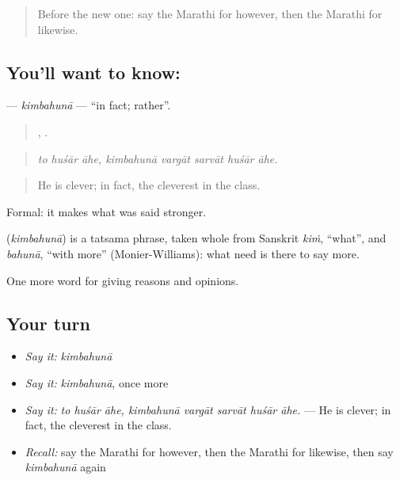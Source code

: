 \label{lesson:MR-C351-kimbahuna}



\begin{quote}
Before the new one: say the Marathi for however, then the Marathi for likewise.
\end{quote}

\subsection*{You'll want to know: }
\textbf{} — \emph{kimbahunā} — \textquotedblleft{}in fact; rather\textquotedblright{}.

\begin{quote}
  ,     .
\end{quote}

\begin{quote}
\emph{to huśār āhe, kimbahunā vargāt sarvāt huśār āhe.}
\end{quote}

\begin{quote}
He is clever; in fact, the cleverest in the class.
\end{quote}

Formal: it makes what was said stronger.

\begin{cousinweb}
\textbf{} (\emph{kimbahunā}) is a tatsama phrase, taken whole from Sanskrit \emph{kiṁ}, \textquotedblleft{}what\textquotedblright{}, and \emph{bahunā}, \textquotedblleft{}with more\textquotedblright{} (Monier-Williams): what need is there to say more.
\end{cousinweb}

\begin{grammarlens}[title={What you've built}]
One more word for giving reasons and opinions.
\end{grammarlens}

\subsection*{Your turn}
\begin{itemize}
\raggedright
  \item \emph{Say it:} \emph{kimbahunā}
  \item \emph{Say it:} \emph{kimbahunā}, once more
  \item \emph{Say it:} \emph{to huśār āhe, kimbahunā vargāt sarvāt huśār āhe.} — He is clever; in fact, the cleverest in the class.
  \item \emph{Recall:} say the Marathi for however, then the Marathi for likewise, then say \emph{kimbahunā} again
\end{itemize}

